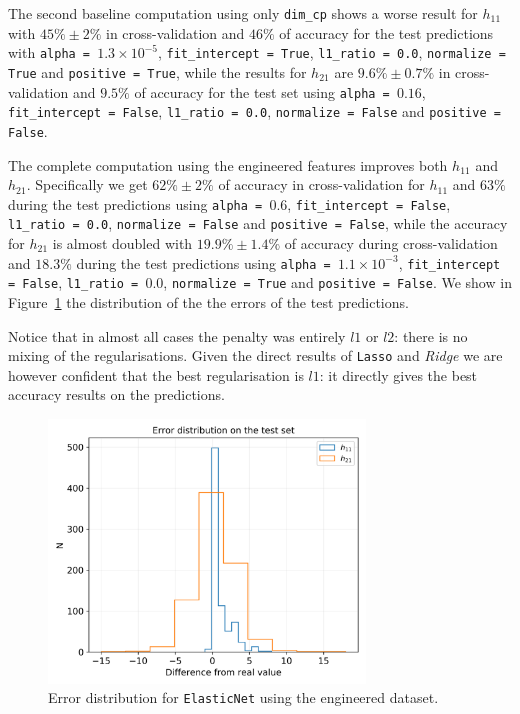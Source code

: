     The second baseline computation using only \texttt{dim\_cp} shows a worse result for $h_{11}$ with $45\% \pm 2\%$ in cross-validation and $46\%$ of accuracy for the test predictions with \texttt{alpha = $1.3 \times 10^{-5}$}, \texttt{fit\_intercept = True}, \texttt{l1\_ratio = 0.0}, \texttt{normalize = True} and \texttt{positive = True}, while the results for $h_{21}$ are $9.6\% \pm 0.7\%$ in cross-validation and $9.5\%$ of accuracy for the test set using \texttt{alpha = $0.16$}, \texttt{fit\_intercept = False}, \texttt{l1\_ratio = 0.0}, \texttt{normalize = False} and \texttt{positive = False}.
    
    The complete computation using the engineered features improves both $h_{11}$ and $h_{21}$. Specifically we get $62\% \pm 2\%$ of accuracy in cross-validation for $h_{11}$ and $63\%$ during the test predictions using \texttt{alpha = $0.6$}, \texttt{fit\_intercept = False}, \texttt{l1\_ratio = 0.0}, \texttt{normalize = False} and \texttt{positive = False}, while the accuracy for $h_{21}$ is almost doubled with $19.9\% \pm 1.4\%$ of accuracy during cross-validation and $18.3\%$ during the test predictions using \texttt{alpha = $1.1 \times 10^{-3}$}, \texttt{fit\_intercept = False}, \texttt{l1\_ratio = $0.0$}, \texttt{normalize = True} and \texttt{positive = False}. We show in Figure~\ref{fig:el_net_err} the distribution of the the errors of the test predictions.
    
    Notice that in almost all cases the penalty was entirely $l1$ or $l2$: there is no mixing of the regularisations. Given the direct results of \texttt{Lasso} and \textit{Ridge} we are however confident that the best regularisation is $l1$: it directly gives the best accuracy results on the predictions.
    
    \begin{figure}[t]
        \centering
        \includegraphics[width=0.75\textwidth]{tex/img/el_net_error_eng.png}
        \caption{Error distribution for \texttt{ElasticNet} using the engineered dataset.}
        \label{fig:el_net_err}
    \end{figure}
    
